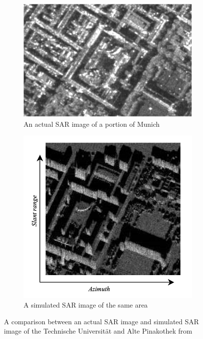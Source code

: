 \begin{figure}
\centering
\begin{subfigure}{.5\textwidth}
	\centering
	\includegraphics[width=0.7\linewidth]{../figures/franceschetti_2007_munich_sar}
	\caption{An actual SAR image of a portion of Munich}
	\label{fig:franceschetti_2007_munich_sar}
\end{subfigure}%
\begin{subfigure}{.5\textwidth}
	\centering
	\includegraphics[width=0.7\linewidth]{../figures/franceschetti_2007_munich_sim}	
	\caption{A simulated SAR image of the same area}
	\label{fig:franceschetti_2007_munich_sim}
\end{subfigure}
\caption{A comparison between an actual SAR image and simulated SAR image of the Technische Universität and Alte Pinakothek from \cite{franceschettiSimulationToolsInterpretation2007}}
\label{fig:franceschetti_2007_munich}
	
\end{figure}

